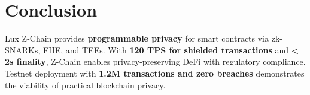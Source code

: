 \section{Conclusion}


Lux Z-Chain provides \textbf{programmable privacy} for smart contracts via zk-SNARKs, FHE, and TEEs. With \textbf{120 TPS for shielded transactions} and \textbf{< 2s finality}, Z-Chain enables privacy-preserving DeFi with regulatory compliance. Testnet deployment with \textbf{1.2M transactions and zero breaches} demonstrates the viability of practical blockchain privacy.

\appendix

